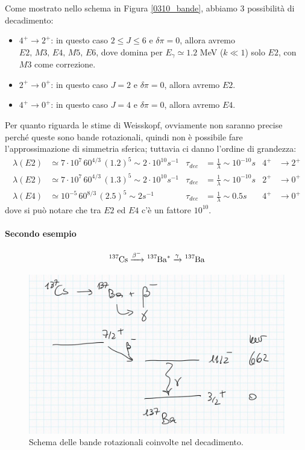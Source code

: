 \noindent Come mostrato nello schema in Figura \ref{0310_bande}, abbiamo 3 possibilità di decadimento:
\begin{itemize}
    \item $4^+\to2^+$: in questo caso $2\leq J\leq 6$ e $\delta \pi = 0$, allora avremo $E2,\,M3,\,E4,\,M5,\,E6$, dove domina per $E_\gamma\simeq 1.2$ MeV ($k\ll 1$) solo $E2$, con $M3$ come correzione.
    \item $2^+\to0^+$: in questo caso $J=2$ e $\delta \pi = 0$, allora avremo $E2$.
    \item $4^+\to0^+$: in questo caso $J=4$ e $\delta \pi = 0$, allora avremo $E4$.
\end{itemize}
\noindent  Per quanto riguarda le stime di Weisskopf, ovviamente non saranno precise perché queste sono bande rotazionali, quindi non è possibile fare l'approssimazione di simmetria sferica; tuttavia ci danno l'ordine di grandezza:
\begin{displaymath}
\begin{aligned}
\lambda(E2) &\simeq 7\cdot 10^7 \, 60^{4/3}\, (1.2)^5 \sim 2\cdot 10^{10} \unit{s}^{-1} & \tau_{dec} &= \frac{1}{\lambda} \sim 10^{-10} \unit{s} & 4^+&\to2^+ \\
%
\lambda(E2) &\simeq 7\cdot 10^7 \, 60^{4/3}\, (1.3)^5 \sim 2\cdot 10^{10} \unit{s}^{-1} & \tau_{dec} &= \frac{1}{\lambda} \sim 10^{-10} \unit{s} & 2^+&\to0^+ \\
%
\lambda(E4) &\simeq 10^{-5} \, 60^{8/3}\, (2.5)^5 \sim 2 \unit{s}^{-1} & \tau_{dec} &= \frac{1}{\lambda} \sim 0.5 \unit{s} & 4^+&\to0^+ 
\end{aligned}
\end{displaymath}
dove si può notare che tra $E2$ ed $E4$ c'è un fattore $10^{10}$. 

\paragraph{Secondo esempio}
$$\ce{^{137}Cs}  \xrightarrow{\beta^-} \ce{^{137}Ba}^*  \xrightarrow{\gamma}  \ce{^{137}Ba}$$

\begin{figure}[h]
    \centering
    \includegraphics[scale=0.2]{Immagini/0310_bande2.png}
    \caption{Schema delle bande rotazionali coinvolte nel decadimento.}
    \label{0310_bande1}
\end{figure}

